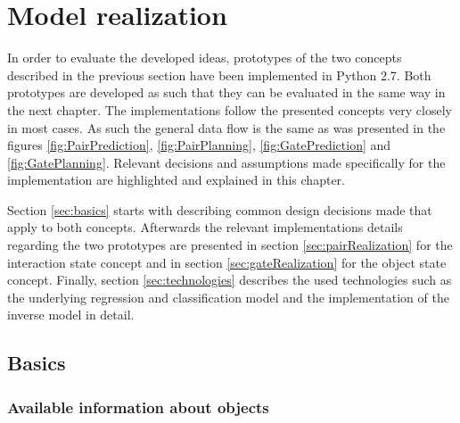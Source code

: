\chapter{Model realization\label{chap:modelReal}}




In order to evaluate the developed ideas, prototypes of the two concepts described in the previous section have been implemented in Python 2.7. Both prototypes are developed as such that they can be evaluated in the same way in the next chapter. The implementations follow the presented concepts very closely in most cases. As such the general data flow is the same as was presented in the figures  \ref{fig:PairPrediction}, \ref{fig:PairPlanning}, \ref{fig:GatePrediction} and \ref{fig:GatePlanning}.
Relevant decisions and assumptions made specifically for the implementation are highlighted and explained in this chapter. %

Section \ref{sec:basics} starts with describing common design decisions made that apply to both concepts. Afterwards the relevant implementations details regarding the two prototypes are presented in section \ref{sec:pairRealization} for the interaction state concept and in section \ref{sec:gateRealization} for the object state concept. Finally, section \ref{sec:technologies} describes the used technologies such as the underlying regression and classification model and the implementation of the inverse model in detail.

\section{Basics \label{sec:basics}}


\subsection{Available information about objects}

